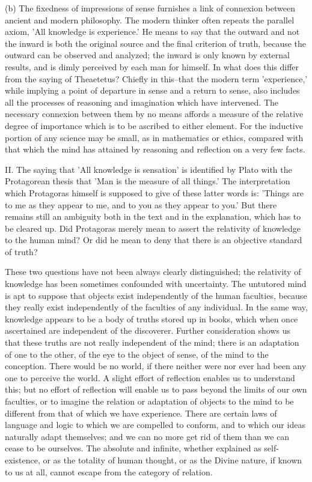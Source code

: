 (b) The fixedness of impressions of sense furnishes a link of connexion
between ancient and modern philosophy. The modern thinker often repeats
the parallel axiom, 'All knowledge is experience.' He means to say that
the outward and not the inward is both the original source and the final
criterion of truth, because the outward can be observed and analyzed;
the inward is only known by external results, and is dimly perceived
by each man for himself. In what does this differ from the saying of
Theaetetus? Chiefly in this--that the modern term 'experience,' while
implying a point of departure in sense and a return to sense, also
includes all the processes of reasoning and imagination which have
intervened. The necessary connexion between them by no means affords a
measure of the relative degree of importance which is to be ascribed to
either element. For the inductive portion of any science may be small,
as in mathematics or ethics, compared with that which the mind has
attained by reasoning and reflection on a very few facts.

II. The saying that 'All knowledge is sensation' is identified by Plato
with the Protagorean thesis that 'Man is the measure of all things.'
The interpretation which Protagoras himself is supposed to give of these
latter words is: 'Things are to me as they appear to me, and to you as
they appear to you.' But there remains still an ambiguity both in the
text and in the explanation, which has to be cleared up. Did Protagoras
merely mean to assert the relativity of knowledge to the human mind? Or
did he mean to deny that there is an objective standard of truth?

These two questions have not been always clearly distinguished; the
relativity of knowledge has been sometimes confounded with uncertainty.
The untutored mind is apt to suppose that objects exist independently
of the human faculties, because they really exist independently of the
faculties of any individual. In the same way, knowledge appears to be
a body of truths stored up in books, which when once ascertained are
independent of the discoverer. Further consideration shows us that these
truths are not really independent of the mind; there is an adaptation of
one to the other, of the eye to the object of sense, of the mind to the
conception. There would be no world, if there neither were nor ever
had been any one to perceive the world. A slight effort of reflection
enables us to understand this; but no effort of reflection will enable
us to pass beyond the limits of our own faculties, or to imagine the
relation or adaptation of objects to the mind to be different from that
of which we have experience. There are certain laws of language and
logic to which we are compelled to conform, and to which our ideas
naturally adapt themselves; and we can no more get rid of them than we
can cease to be ourselves. The absolute and infinite, whether explained
as self-existence, or as the totality of human thought, or as the
Divine nature, if known to us at all, cannot escape from the category of
relation.

